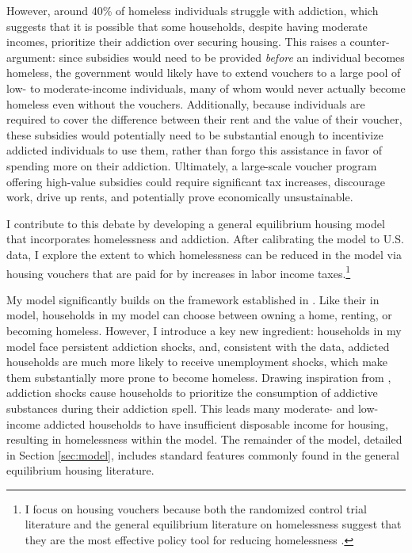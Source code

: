 \documentclass[parskip=full]{article}
\begin{document}
However, around 40\% of homeless individuals struggle with addiction, which suggests that it is possible that some households, despite having moderate incomes, prioritize their addiction over securing housing. This raises a counter-argument: since subsidies would need to be provided \textsl{before} an individual becomes homeless, the government would likely have to extend vouchers to a large pool of low- to moderate-income individuals, many of whom would never actually become homeless even without the vouchers. Additionally, because individuals are required to cover the difference between their rent and the value of their voucher, these subsidies would potentially need to be substantial enough to incentivize addicted individuals to use them, rather than forgo this assistance in favor of spending more on their addiction. Ultimately, a large-scale voucher program offering high-value subsidies could require significant tax increases, discourage work, drive up rents, and potentially prove economically unsustainable.

I contribute to this debate by developing a general equilibrium housing model that incorporates homelessness and addiction. After calibrating the model to U.S. data, I explore the extent to which homelessness can be reduced in the model via housing vouchers that are paid for by increases in labor income taxes.\footnote{I focus on housing vouchers because both the randomized control trial literature and the general equilibrium literature on homelessness suggest that they are the most effective policy tool for reducing homelessness \citep{gubitsetal-2016,az-2024}.}

My model significantly builds on the framework established in \citet{az-2024}. Like their in model, households in my model can choose between owning a home, renting, or becoming homeless. However, I introduce a key new ingredient: households in my model face persistent addiction shocks, and, consistent with the data, addicted households are much more likely to receive unemployment shocks, which make them substantially more prone to become homeless. Drawing inspiration from \citet{becker-stigler-1977}, addiction shocks cause households to prioritize the consumption of addictive substances during their addiction spell. This leads many moderate- and low-income addicted households to have insufficient disposable income for housing, resulting in homelessness within the model. The remainder of the model, detailed in Section \ref{sec:model}, includes standard features commonly found in the general equilibrium housing literature.
\end{document}
